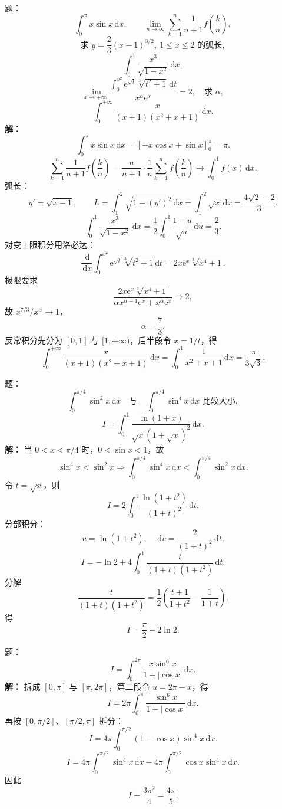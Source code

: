 \documentclass[11pt,a4paper,UTF8]{ctexart}
\newcommand{\dd}{\,\mathrm d}
\newcommand{\ee}{\mathrm e}
\begin{document}
\begin{answerbox}[2023--2024 简答 1、3、4 与大题二、三、四]
题：
\[
\int_0^\pi x\sin x\dd x,\qquad
\lim_{n\to\infty}\sum_{k=1}^n\frac1{n+1}f\left(\frac kn\right),
\]
\[
\text{求 }y=\frac23(x-1)^{3/2},\ 1\le x\le2\text{ 的弧长},
\]
\[
\int_0^1\frac{x^3}{\sqrt{1-x^2}}\dd x,
\]
\[
\lim_{x\to+\infty}
\frac{\int_0^{x^2}\ee^{\sqrt t}\sqrt[3]{t^2+1}\dd t}{x^\alpha\ee^x}=2,
\quad \text{求 }\alpha,
\]
\[
\int_0^{+\infty}\frac{x}{(x+1)(x^2+x+1)}\dd x.
\]
\textbf{解：}
\[
\int_0^\pi x\sin x\dd x
=\left[-x\cos x+\sin x\right]_0^\pi
=\boxed{\pi}.
\]
\[
\sum_{k=1}^n\frac1{n+1}f\left(\frac kn\right)
=\frac{n}{n+1}\cdot\frac1n\sum_{k=1}^n f\left(\frac kn\right)
\to \boxed{\int_0^1 f(x)\dd x}.
\]
弧长：
\[
y'=\sqrt{x-1},\qquad
L=\int_1^2\sqrt{1+(y')^2}\dd x
=\int_1^2\sqrt{x}\dd x
=\boxed{\frac{4\sqrt2-2}{3}}.
\]
\[
\int_0^1\frac{x^3}{\sqrt{1-x^2}}\dd x
=\frac12\int_0^1\frac{1-u}{\sqrt u}\dd u
=\boxed{\frac23}.
\]
对变上限积分用洛必达：
\[
\frac{\dd}{\dd x}\int_0^{x^2}\ee^{\sqrt t}\sqrt[3]{t^2+1}\dd t
=2x\ee^x\sqrt[3]{x^4+1}.
\]
极限要求
\[
\frac{2x\ee^x\sqrt[3]{x^4+1}}{\alpha x^{\alpha-1}\ee^x+x^\alpha\ee^x}
\to2,
\]
故 \(x^{7/3}/x^\alpha\to1\)，
\[
\boxed{\alpha=\frac73}.
\]
反常积分先分为 \([0,1]\) 与 \([1,+\infty)\)，后半段令 \(x=1/t\)，得
\[
\int_0^{+\infty}\frac{x}{(x+1)(x^2+x+1)}\dd x
=\int_0^1\frac{1}{x^2+x+1}\dd x
=\boxed{\frac{\pi}{3\sqrt3}}.
\]
\end{answerbox}

\begin{answerbox}[2024--2025 简答 2 与大题六]
题：
\[
\int_0^{\pi/4}\sin^2x\dd x
\quad\text{与}\quad
\int_0^{\pi/4}\sin^4x\dd x\text{ 比较大小},
\]
\[
I=\int_0^1\frac{\ln(1+x)}{\sqrt x(1+\sqrt x)^2}\dd x.
\]
\textbf{解：}
当 \(0<x<\pi/4\) 时，\(0<\sin x<1\)，故
\[
\sin^4x<\sin^2x
\Rightarrow
\boxed{\int_0^{\pi/4}\sin^4x\dd x
<
\int_0^{\pi/4}\sin^2x\dd x}.
\]
令 \(t=\sqrt x\)，则
\[
I=2\int_0^1\frac{\ln(1+t^2)}{(1+t)^2}\dd t.
\]
分部积分：
\[
u=\ln(1+t^2),\quad \dd v=\frac{2}{(1+t)^2}\dd t.
\]
\[
I=-\ln2+4\int_0^1\frac{t}{(1+t)(1+t^2)}\dd t.
\]
分解
\[
\frac{t}{(1+t)(1+t^2)}
=\frac12\left(\frac{t+1}{1+t^2}-\frac1{1+t}\right).
\]
得
\[
\boxed{I=\frac\pi2-2\ln2}.
\]
\end{answerbox}

\begin{answerbox}[2021--2022 大题：含绝对值三角积分]
题：
\[
I=\int_0^{2\pi}\frac{x\sin^6x}{1+|\cos x|}\dd x.
\]
\textbf{解：}
拆成 \([0,\pi]\) 与 \([\pi,2\pi]\)，第二段令 \(u=2\pi-x\)，得
\[
I=2\pi\int_0^\pi\frac{\sin^6x}{1+|\cos x|}\dd x.
\]
再按 \([0,\pi/2]\)、\([\pi/2,\pi]\) 拆分：
\[
I=4\pi\int_0^{\pi/2}(1-\cos x)\sin^4x\dd x.
\]
\[
I=4\pi\int_0^{\pi/2}\sin^4x\dd x
-4\pi\int_0^{\pi/2}\cos x\sin^4x\dd x.
\]
因此
\[
\boxed{I=\frac{3\pi^2}{4}-\frac{4\pi}{5}}.
\]
\end{answerbox}
\end{document}
